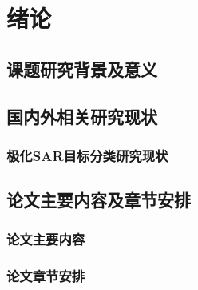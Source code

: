 \chapter{绪\hspace{6pt}论}

\section{课题研究背景及意义}
\section{国内外相关研究现状}
\subsection{极化SAR目标分类研究现状}
\section{论文主要内容及章节安排}
\subsection{论文主要内容}
\subsection{论文章节安排}